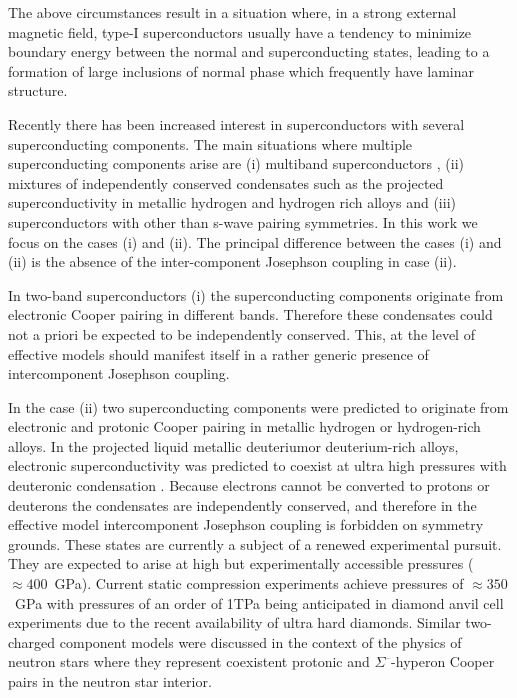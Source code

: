 The above circumstances result in a situation where, in a strong external 
magnetic field, type-I superconductors usually have a tendency to minimize 
boundary energy between the normal and superconducting states, leading to a 
formation of large inclusions of normal phase which frequently have laminar 
structure\cite{bib:4}. 

Recently there has been increased interest in superconductors with several 
superconducting components. The main situations where multiple superconducting 
components arise are (i) multiband superconductors
\cite{bib:6,bib:7,bib:8,bib:9,bib:10,bib:11}, 
(ii) mixtures of independently conserved condensates such as the projected 
superconductivity in metallic hydrogen and hydrogen rich alloys 
\cite{bib:12,bib:13,bib:14} and (iii) superconductors with other than s-wave 
pairing symmetries. In this work we focus on the cases (i) and (ii). The 
principal difference between the cases (i) and (ii) is the absence of the 
inter-component Josephson coupling in case (ii). 

In two-band superconductors (i) the superconducting components originate from 
electronic Cooper pairing in different bands\cite{bib:6}. Therefore these 
condensates could not a priori be expected to be independently conserved. 
This, at the level of effective models should manifest itself in a rather 
generic presence of intercomponent Josephson coupling. 

In the case (ii) two superconducting components were predicted to originate 
from electronic and protonic Cooper pairing in metallic hydrogen or 
hydrogen-rich alloys. In the projected liquid metallic deuteriumor 
deuterium-rich alloys, electronic superconductivity was predicted to coexist 
at ultra high pressures with deuteronic condensation 
\cite{bib:12,bib:13,bib:14}. Because electrons cannot be converted to protons 
or deuterons the condensates are independently conserved, and therefore in the 
effective model intercomponent Josephson coupling is forbidden on symmetry 
grounds. These states are currently a subject of a renewed experimental 
pursuit. They are expected to arise at high but experimentally accessible 
pressures (\( \approx 400 \)~GPa). Current static compression experiments 
achieve pressures of \( \approx 350 \)~GPa with pressures of an order of 
1TPa being anticipated in diamond anvil cell experiments due to the recent 
availability of ultra hard diamonds. Similar two-charged component models 
were discussed in the context of the physics of neutron stars where they 
represent coexistent protonic and \( \Sigma^\text{--} \)-hyperon Cooper pairs 
in the neutron star interior\cite{bib:15}. 

